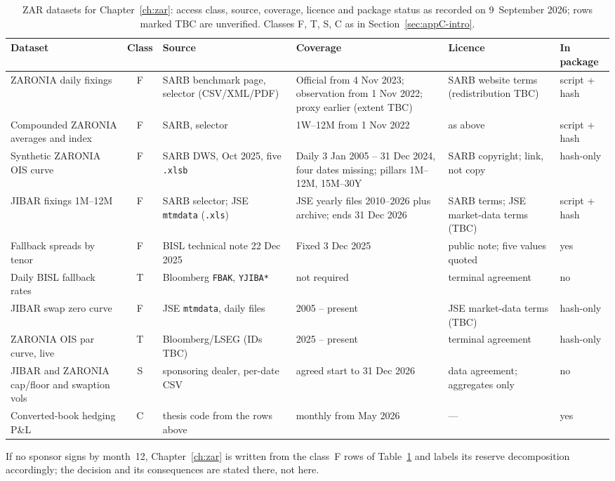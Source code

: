 \begin{table}[htbp]\centering\small
\caption{ZAR datasets for Chapter~\ref{ch:zar}: access class, source, coverage, licence and package status as recorded on 9~September 2026; rows marked TBC are unverified. Classes F, T, S, C as in Section~\ref{sec:appC-intro}.}\label{tab:appC-zar}
\scriptsize
\begin{tabular}{@{}p{2.5cm}cp{2.2cm}p{2.9cm}p{2.5cm}p{1.6cm}@{}}
\toprule
Dataset & Class & Source & Coverage & Licence & In package\\
\midrule
ZARONIA daily fixings & F & SARB benchmark page, selector (CSV/XML/PDF) & Official from 4 Nov 2023; observation from 1 Nov 2022; proxy earlier (extent TBC) & SARB website terms (redistribution TBC) & script + hash\\
Compounded ZARONIA averages and index & F & SARB, selector & 1W--12M from 1 Nov 2022 & as above & script + hash\\
Synthetic ZARONIA OIS curve & F & SARB DWS, Oct 2025, five \texttt{.xlsb} & Daily 3 Jan 2005 -- 31 Dec 2024, four dates missing; pillars 1M--12M, 15M--30Y & SARB copyright; link, not copy & hash-only\\
JIBAR fixings 1M--12M & F & SARB selector; JSE \texttt{mtmdata} (\texttt{.xls}) & JSE yearly files 2010--2026 plus archive; ends 31 Dec 2026 & SARB terms; JSE market-data terms (TBC) & script + hash\\
Fallback spreads by tenor & F & BISL technical note 22 Dec 2025 & Fixed 3 Dec 2025 & public note; five values quoted & yes\\
Daily BISL fallback rates & T & Bloomberg \texttt{FBAK}, \texttt{YJIBA*} & not required & terminal agreement & no\\
JIBAR swap zero curve & F & JSE \texttt{mtmdata}, daily files & 2005 -- present & JSE market-data terms (TBC) & hash-only\\
ZARONIA OIS par curve, live & T & Bloomberg/LSEG (IDs TBC) & 2025 -- present & terminal agreement & hash-only\\
JIBAR and ZARONIA cap/floor and swaption vols & S & sponsoring dealer, per-date CSV & agreed start to 31 Dec 2026 & data agreement; aggregates only & no\\
Converted-book hedging P\&L & C & thesis code from the rows above & monthly from May 2026 & --- & yes\\
\bottomrule
\end{tabular}
\end{table}


If no sponsor signs by month~12, Chapter~\ref{ch:zar} is written from the class~F rows of Table~\ref{tab:appC-zar} and labels its reserve decomposition accordingly; the decision and its consequences are stated there, not here.
